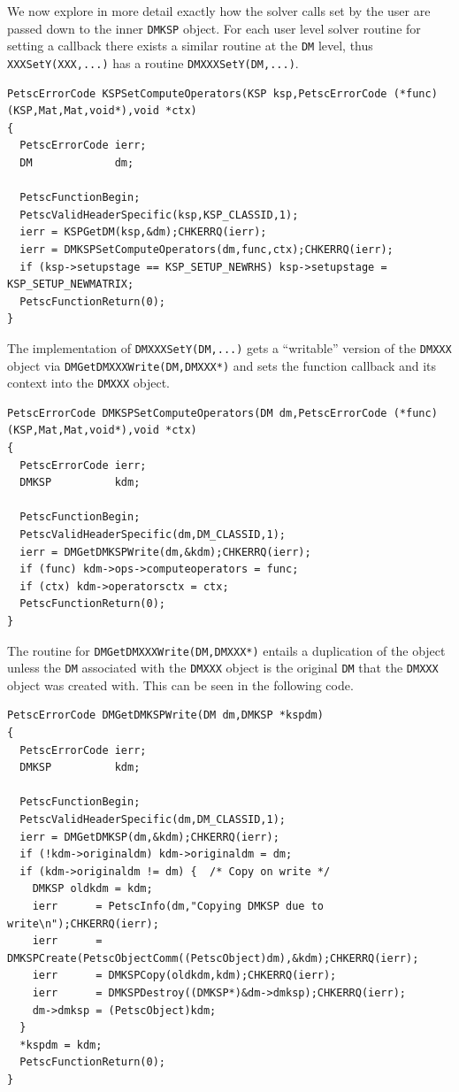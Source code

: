 We now explore in more detail exactly how the solver calls set by the user are passed down to the inner \lstinline{DMKSP} object. For each user
level solver routine for setting a callback there exists a similar routine at the \lstinline{DM} level, thus \lstinline{XXXSetY(XXX,...)} has a routine \lstinline{DMXXXSetY(DM,...)}.
\begin{lstlisting}
PetscErrorCode KSPSetComputeOperators(KSP ksp,PetscErrorCode (*func)(KSP,Mat,Mat,void*),void *ctx)
{
  PetscErrorCode ierr;
  DM             dm;

  PetscFunctionBegin;
  PetscValidHeaderSpecific(ksp,KSP_CLASSID,1);
  ierr = KSPGetDM(ksp,&dm);CHKERRQ(ierr);
  ierr = DMKSPSetComputeOperators(dm,func,ctx);CHKERRQ(ierr);
  if (ksp->setupstage == KSP_SETUP_NEWRHS) ksp->setupstage = KSP_SETUP_NEWMATRIX;
  PetscFunctionReturn(0);
}
\end{lstlisting}
The implementation of \lstinline{DMXXXSetY(DM,...)} gets a ``writable'' version of the \lstinline{DMXXX} object via \lstinline{DMGetDMXXXWrite(DM,DMXXX*)} and sets the function callback
and its context into the \lstinline{DMXXX} object.
\begin{lstlisting}
PetscErrorCode DMKSPSetComputeOperators(DM dm,PetscErrorCode (*func)(KSP,Mat,Mat,void*),void *ctx)
{
  PetscErrorCode ierr;
  DMKSP          kdm;

  PetscFunctionBegin;
  PetscValidHeaderSpecific(dm,DM_CLASSID,1);
  ierr = DMGetDMKSPWrite(dm,&kdm);CHKERRQ(ierr);
  if (func) kdm->ops->computeoperators = func;
  if (ctx) kdm->operatorsctx = ctx;
  PetscFunctionReturn(0);
}
\end{lstlisting}
The routine for \lstinline{DMGetDMXXXWrite(DM,DMXXX*)} entails a duplication of the object unless the \lstinline{DM} associated with the \lstinline{DMXXX} object is the original \lstinline{DM} that
the \lstinline{DMXXX} object was created with. This can be seen in the following code.
\begin{lstlisting}
PetscErrorCode DMGetDMKSPWrite(DM dm,DMKSP *kspdm)
{
  PetscErrorCode ierr;
  DMKSP          kdm;

  PetscFunctionBegin;
  PetscValidHeaderSpecific(dm,DM_CLASSID,1);
  ierr = DMGetDMKSP(dm,&kdm);CHKERRQ(ierr);
  if (!kdm->originaldm) kdm->originaldm = dm;
  if (kdm->originaldm != dm) {  /* Copy on write */
    DMKSP oldkdm = kdm;
    ierr      = PetscInfo(dm,"Copying DMKSP due to write\n");CHKERRQ(ierr);
    ierr      = DMKSPCreate(PetscObjectComm((PetscObject)dm),&kdm);CHKERRQ(ierr);
    ierr      = DMKSPCopy(oldkdm,kdm);CHKERRQ(ierr);
    ierr      = DMKSPDestroy((DMKSP*)&dm->dmksp);CHKERRQ(ierr);
    dm->dmksp = (PetscObject)kdm;
  }
  *kspdm = kdm;
  PetscFunctionReturn(0);
}
\end{lstlisting}
